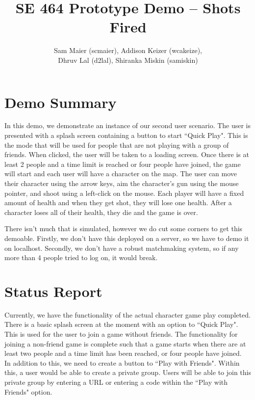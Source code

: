 \documentclass[11pt, oneside]{article}   	%
\title{SE 464 Prototype Demo -- Shots Fired}
\author{Sam Maier (scmaier), Addison Keizer (wcakeize), \\Dhruv Lal (d2lal), Shiranka Miskin (samiskin)}
\begin{document}
\maketitle


\clearpage

\section{Demo Summary}
\hspace*{5mm}In this demo, we demonstrate an instance of our second user scenario. The user
is presented with a splash screen containing a button to start ``Quick Play".
This is the mode that will be used for people that are not playing with a group
of friends. When clicked, the user will be taken to a loading screen.
Once there is at least 2 people and a time limit is
reached or four people have joined, the game will start and each user will have
a character on the map. The user can move their character using the arrow keys,
aim the character's gun using the mouse pointer, and shoot using a left-click
on the mouse. Each player will have a fixed amount of health and when they get
shot, they will lose one health. After a character loses all of their health,
they die and the game is over.

There isn't much that is simulated, however we do cut some corners to get this
demoable. Firstly, we don't have this deployed on a server, so we have to demo
it on localhost. Secondly, we don't have a robust matchmaking system, so if
any more than 4 people tried to log on, it would break.

\section{Status Report}
\hspace*{5mm}
Currently, we have the functionality of the actual character game play completed. There
is a basic splash screen at the moment with an option to ``Quick Play". This is
used for the user to join a game without friends. The functionality for joining
a non-friend game is complete such that a game starts when there are at least
two people and a time limit has been reached, or four people have joined.\\

In addition to this, we need to create a button to ``Play with Friends". Within
this, a user would be able to create a private group. Users will be able to
join this private group by entering a URL or entering a code within the ``Play
with Friends" option.\\
\end{document}
